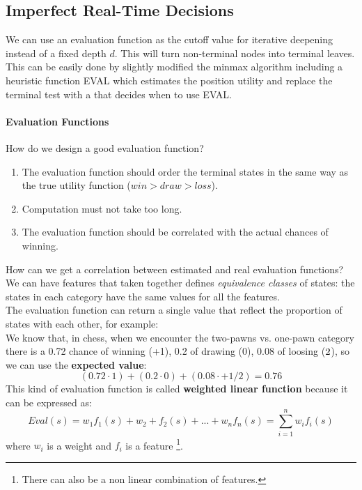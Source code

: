 \documentclass[10pt,a4paper]{article}
\begin{document}
\subsection{Imperfect Real-Time Decisions}
We can use an evaluation function as the cutoff value for iterative deepening instead of a fixed depth $d$. This will turn non-terminal nodes into terminal leaves. This can be easily done by slightly modified the minmax algorithm including a heuristic function EVAL which estimates the position utility and replace the terminal test with a  that decides when to use EVAL.

\paragraph{Evaluation Functions}
How do we design a good evaluation function?
\begin{enumerate}
\item The evaluation function should order the terminal states in the same way as the true utility function ($win> draw> loss$).
\item Computation must not take too long.
\item The evaluation function should be correlated with the actual chances of winning.
\end{enumerate}

How can we get a correlation between estimated and real evaluation functions?\\

We can have features that taken together defines \textit{equivalence classes} of states: the states in each category have the same values for all the features.\\
The evaluation function can return a single value that reflect the proportion of states with each other, for example:\\ 
We know that, in chess, when we encounter the two-pawns vs. one-pawn category there is a 0.72 chance of winning (+1), 0.2 of drawing (0), 0.08 of loosing ($\/2$), so we can use the \textbf{expected value}: 
\[(0.72\cdot 1)+(0.2 \cdot 0)+(0.08 \cdot +1/2)=0.76\]
This kind of evaluation function is called \textbf{weighted linear function} because it can be expressed as:
\[Eval(s)=w_1f_1(s)+w_2+f_2(s)+...+w_nf_n(s)=\sum_{i=1}^nw_if_i(s)\]
where $w_i$ is a weight and $f_i$ is a feature \footnote{There can also be a non linear combination of features.}.
\end{document}
